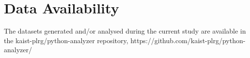 

\section{Data Availability}
The datasets generated and/or analysed during the current study are available in the kaist-plrg/python-analyzer repository, 
https://github.com/kaist-plrg/python-analyzer/
